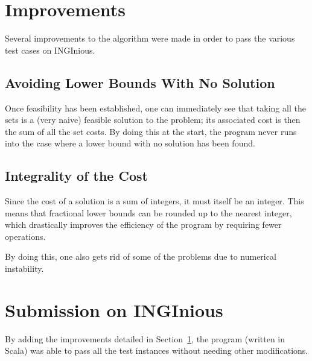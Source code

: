 \documentclass[journal]{IEEEtran}
\begin{document}
\section{Improvements}
\label{sec:improvements}
Several improvements to the algorithm were made in order to pass the various test cases on INGInious.

\subsection{Avoiding Lower Bounds With No Solution}
Once feasibility has been established, one can immediately see that taking all the sets is a (very naive) feasible solution to the problem; its associated cost is then the sum of all the set costs.
By doing this at the start, the program never runs into the case where a lower bound with no solution has been found.

\subsection{Integrality of the Cost}
\label{sec:ceil}
Since the cost of a solution is a sum of integers, it must itself be an integer.
This means that fractional lower bounds can be rounded up to the nearest integer, which drastically improves the efficiency of the program by requiring fewer operations.

By doing this, one also gets rid of some of the problems due to numerical instability.

\section{Submission on INGInious}
By adding the improvements detailed in Section~\ref{sec:improvements}, the program (written in Scala) was able to pass all the test instances without needing other modifications.
\end{document}
